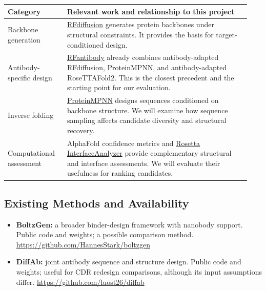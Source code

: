 \begin{center}
\small
\begin{tabular}{@{}p{0.23\linewidth} p{0.71\linewidth}@{}}
\toprule
\textbf{Category} & \textbf{Relevant work and relationship to this project} \\
\midrule
Backbone generation & \href{https://www.nature.com/articles/s41586-023-06415-8}{RFdiffusion} generates protein backbones under structural constraints. It provides the basis for target-conditioned design. \\
\addlinespace
Antibody-specific design & \href{https://github.com/RosettaCommons/RFantibody}{RFantibody} already combines antibody-adapted RFdiffusion, ProteinMPNN, and antibody-adapted RoseTTAFold2. This is the closest precedent and the starting point for our evaluation. \\
\addlinespace
Inverse folding & \href{https://github.com/dauparas/ProteinMPNN}{ProteinMPNN} designs sequences conditioned on backbone structure. We will examine how sequence sampling affects candidate diversity and structural recovery. \\
\addlinespace
Computational assessment & AlphaFold confidence metrics and \href{https://docs.rosettacommons.org/docs/latest/application_documentation/analysis/interface-analyzer}{Rosetta InterfaceAnalyzer} provide complementary structural and interface assessments. We will evaluate their usefulness for ranking candidates. \\
\bottomrule
\end{tabular}
\end{center}

\subsection{Existing Methods and Availability}
\begin{itemize}
    \item \textbf{BoltzGen:} a broader binder-design framework with nanobody support. Public code and weights; a possible comparison method. \url{https://github.com/HannesStark/boltzgen}
    \item \textbf{DiffAb:} joint antibody sequence and structure design. Public code and weights; useful for CDR redesign comparisons, although its input assumptions differ.
    \url{https://github.com/luost26/diffab}
\end{itemize}
